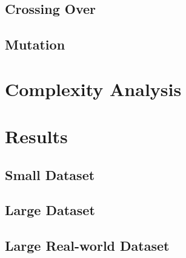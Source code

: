 \documentclass[UTF8]{report}
\begin{document}
\subsection{Crossing Over}

\subsection{Mutation}

\section{Complexity Analysis}

\section{Results}

\subsection{Small Dataset}

\subsection{Large Dataset}

\subsection{Large Real-world Dataset}
\end{document}

